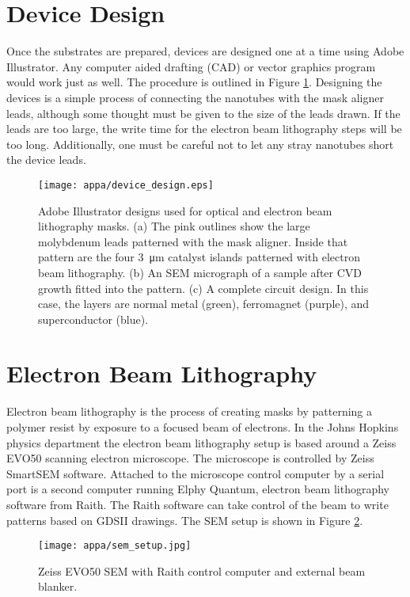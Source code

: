\section{Device Design}
\label{sec:device_design}

Once the substrates are prepared, devices are designed one at a time using Adobe Illustrator. Any computer aided drafting (CAD) or vector graphics program would work just as well. The procedure is outlined in Figure \ref{fig:device_design}. Designing the devices is a simple process of connecting the nanotubes with the mask aligner leads, although some thought must be given to the size of the leads drawn. If the leads are too large, the write time for the electron beam lithography steps will be too long. Additionally, one must be careful not to let any stray nanotubes short the device leads.

\begin{figure}
	\centering
	\texttt{[image: appa/device\_design.eps]}
	\caption{Adobe Illustrator designs used for optical and electron beam lithography masks. (a) The pink outlines show the large molybdenum leads patterned with the mask aligner. Inside that pattern are the four \SI{3}{\micro\meter} catalyst islands patterned with electron beam lithography. (b) An SEM micrograph of a sample after CVD growth fitted into the pattern. (c) A complete circuit design. In this case, the layers are normal metal (green), ferromagnet (purple), and superconductor (blue).} 
	\label{fig:device_design}
\end{figure}

\section{Electron Beam Lithography}
\label{sec:ebeam_lith}

Electron beam lithography is the process of creating masks by patterning a polymer resist by exposure to a focused beam of electrons. In the Johns Hopkins physics department the electron beam lithography setup is based around a Zeiss EVO50 scanning electron microscope. The microscope is controlled by Zeiss SmartSEM software. Attached to the microscope control computer by a serial port is a second computer running Elphy Quantum, electron beam lithography software from Raith. The Raith software can take control of the beam to write patterns based on GDSII drawings. The SEM setup is shown in Figure \ref{fig:sem_setup}.

\begin{figure}
	\centering
	\texttt{[image: appa/sem\_setup.jpg]}
	\caption{Zeiss EVO50 SEM with Raith control computer and external beam blanker.}
	\label{fig:sem_setup}
\end{figure}

